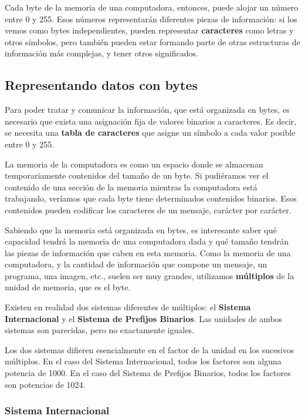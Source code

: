 \documentclass[spanish,a4paper,]{article}
\begin{document}
Cada byte de la memoria de una computadora, entonces, puede alojar un
número entre 0 y 255. Esos números representarán diferentes piezas de
información: si los vemos como bytes independientes, pueden representar
\textbf{caracteres} como letras y otros símbolos, pero también pueden
estar formando parte de otras estructuras de información más complejas,
y tener otros significados.

\hypertarget{representando-datos-con-bytes}{%
\subsection{Representando datos con
bytes}\label{representando-datos-con-bytes}}

Para poder tratar y comunicar la información, que está organizada en
bytes, es necesario que exista una asignación fija de valores binarios a
caracteres. Es decir, se necesita una \textbf{tabla de caracteres} que
asigne un símbolo a cada valor posible entre 0 y 255.

La memoria de la computadora es como un espacio donde se almacenan
temporariamente contenidos del tamaño de un byte. Si pudiéramos ver el
contenido de una sección de la memoria mientras la computadora está
trabajando, veríamos que cada byte tiene determinados contenidos
binarios. Esos contenidos pueden codificar los caracteres de un mensaje,
carácter por carácter.

Sabiendo que la memoria está organizada en bytes, es interesante saber
qué capacidad tendrá la memoria de una computadora dada y qué tamaño
tendrán las piezas de información que caben en esta memoria. Como la
memoria de una computadora, y la cantidad de información que compone un
mensaje, un programa, una imagen, etc., suelen ser muy grandes,
utilizamos \textbf{múltiplos} de la unidad de memoria, que es el byte.

Existen en realidad dos sistemas diferentes de múltiplos: el
\textbf{Sistema Internacional} y el \textbf{Sistema de Prefijos
Binarios}. Las unidades de ambos sistemas son parecidas, pero no
exactamente iguales.

Los dos sistemas difieren esencialmente en el factor de la unidad en los
sucesivos múltiplos. En el caso del Sistema Internacional, todos los
factores son alguna potencia de 1000. En el caso del Sistema de Prefijos
Binarios, todos los factores son potencias de 1024.

\hypertarget{sistema-internacional}{%
\subsubsection{Sistema Internacional}\label{sistema-internacional}}
\end{document}
